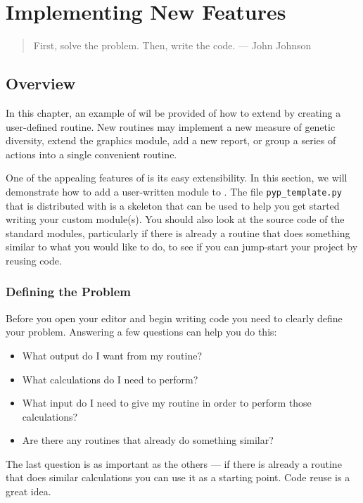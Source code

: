 \chapter{Implementing New Features}
\label{cha:newfeatures}
\begin{quote}
First, solve the problem. Then, write the code. --- John Johnson
\end{quote}
\section{Overview}\label{sec:newfeatures-overview}
In this chapter, an example of wil be provided of how to extend \PyPedal{} by creating a user-defined routine.  New routines may implement a new measure of genetic diversity, extend the graphics module, add a new report, or group a series of actions into a single convenient routine.

One of the appealing features of \PyPedal{} is its easy extensibility.  In this section, we will demonstrate how to add a
user-written module to \PyPedal{}.  The file \texttt{pyp\_template.py} that is distributed with \PyPedal{} is a
skeleton that can be used to help you get started writing your custom module(s).  You should also look at the source
code of the standard modules, particularly if there is already a routine that does something similar to what you would
like to do, to see if you can jump-start your project by reusing code.
\subsection{Defining the Problem}
\label{sec:newfeatures-overview-problem}
Before you open your editor and begin writing code you need to clearly define your problem.  Answering a few questions can
help you do this:
\begin{itemize}
\item What output do I want from my routine?
\item What calculations do I need to perform?
\item What input do I need to give my routine in order to perform those calculations?
\item Are there any \PyPedal{} routines that already do something similar?
\end{itemize}
The last question is as important as the others --- if there is already a \PyPedal{} routine that does similar calculations
you can use it as a starting point.  Code reuse is a great idea.

